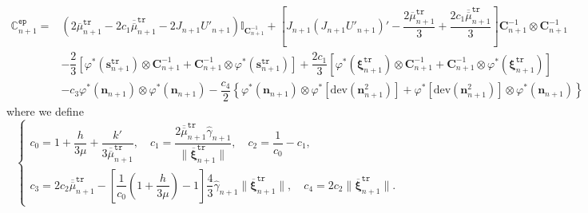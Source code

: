 \documentclass[preprint,11pt]{elsarticle}
\theoremstyle{definition}
\begin{document}
\begin{equation} \label{Second Elastoplastic Moduli Final}
    \begin{array}{ll}
        \mathbb{C}_{n+1}^\texttt{ep} = &\left( 2 \overline{\mu}_{n+1}^\texttt{tr} - 2 c_1 \overline{\overline{\mu}}_{n+1}^\texttt{tr} - 2 J_{n+1} U'_{n+1} \right) \mathbb{I}_{\mathbf{C}_{n+1}^{-1}}
        
        + \left[ J_{n+1} (J_{n+1} U'_{n+1})' - \dfrac{2 \overline{\mu}_{n+1}^\texttt{tr}}{3} + \dfrac{2 c_1 \overline{\overline{\mu}}_{n+1}^\texttt{tr}}{3} \right] \mathbf{C}_{n+1}^{-1} \otimes \mathbf{C}_{n+1}^{-1} \\[12pt]
        
        &- \dfrac{2}{3} \left[ \varphi^*(\mathbf{s}_{n+1}^\texttt{tr}) \otimes \mathbf{C}_{n+1}^{-1} + \mathbf{C}_{n+1}^{-1} \otimes \varphi^*(\mathbf{s}_{n+1}^\texttt{tr}) \right]

        + \dfrac{2 c_1}{3} \left[ \varphi^*(\boldsymbol{\xi}_{n+1}^\texttt{tr}) \otimes \mathbf{C}_{n+1}^{-1} + \mathbf{C}_{n+1}^{-1} \otimes \varphi^*(\boldsymbol{\xi}_{n+1}^\texttt{tr}) \right] \\[12pt]

        &- c_3 \varphi^*(\mathbf{n}_{n+1}) \otimes \varphi^*(\mathbf{n}_{n+1})

        - \dfrac{c_4}{2} \left\{ \varphi^*(\mathbf{n}_{n+1}) \otimes \varphi^*\left[ \text{dev} (\mathbf{n}_{n+1}^2) \right] + \varphi^*\left[ \text{dev} (\mathbf{n}_{n+1}^2) \right] \otimes \varphi^*(\mathbf{n}_{n+1}) \right\}
    \end{array}
\end{equation}
where we define
\begin{equation} \label{Parameters in Elasticity}
    \left\{ \begin{array}{l}
        c_0 =  1 + \dfrac{h}{3\mu} + \dfrac{k'}{3 \overline{\overline{\mu}}_{n+1}^\texttt{tr}}, \quad
        c_1 = \dfrac{2 \overline{\overline{\mu}}_{n+1}^\texttt{tr} \widehat{\gamma}_{n+1}}{\lVert \overline{\boldsymbol{\xi}}_{n+1}^\texttt{tr} \rVert}, \quad
        c_2 = \dfrac{1}{c_0} - c_1, \quad \\[12pt]
        
        c_3 = 2 c_2 \overline{\overline{\mu}}_{n+1}^\texttt{tr}
        - \left[ \dfrac{1}{c_0} \left( 1 + \dfrac{h}{3 \mu} \right) - 1 \right] \dfrac{4}{3} \widehat{\gamma}_{n+1} \lVert \overline{\boldsymbol{\xi}}_{n+1}^\texttt{tr} \rVert, \quad
        c_4 = 2 c_2 \lVert \overline{\boldsymbol{\xi}}_{n+1}^\texttt{tr} \rVert.
    \end{array} \right.
\end{equation}
\end{document}
